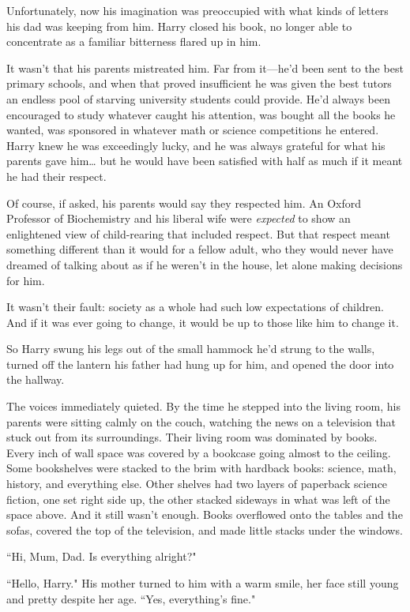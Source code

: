 Unfortunately, now his imagination was preoccupied with
what kinds of letters his dad was keeping from him. Harry
closed his book, no longer able to concentrate as a familiar
bitterness flared up in him.

It wasn't that his parents mistreated him. Far from it---he'd
been sent to the best primary schools, and when that
proved insufficient he was given the best tutors an endless
pool of starving university students could provide. He'd
always been encouraged to study whatever caught his
attention, was bought all the books he wanted, was
sponsored in whatever math or science competitions he
entered. Harry knew he was exceedingly lucky, and he was
always grateful for what his parents gave him{\ldots} but he
would have been satisfied with half as much if it meant he
had their respect.

Of course, if asked, his parents would say they respected
him. An Oxford Professor of Biochemistry and his liberal
wife were \emph{expected} to show an enlightened view of
child-rearing that included respect. But that respect meant
something different than it would for a fellow adult, who
they would never have dreamed of talking about as if he
weren't in the house, let alone making decisions for him.

It wasn't their fault: society as a whole had such low
expectations of children. And if it was ever going to
change, it would be up to those like him to change it.

So Harry swung his legs out of the small hammock he'd
strung to the walls, turned off the lantern his father had
hung up for him, and opened the door into the hallway.

The voices immediately quieted. By the time he stepped
into the living room, his parents were sitting calmly on the
couch, watching the news on a television that stuck out
from its surroundings. Their living room was
dominated by books. Every inch of wall space was covered
by a bookcase going almost to the ceiling. Some
bookshelves were stacked to the brim with hardback
books: science, math, history, and everything else. Other
shelves had two layers of paperback science fiction, one
set right side up, the other stacked sideways in what was left
of the space above. And it still wasn't enough. Books 
overflowed onto the tables and the sofas, covered the top
of the television, and made little stacks under the windows.

``Hi, Mum, Dad. Is everything alright?"

``Hello, Harry." His mother turned to him with a warm
smile, her face still young and pretty despite her age. ``Yes,
everything's fine."


